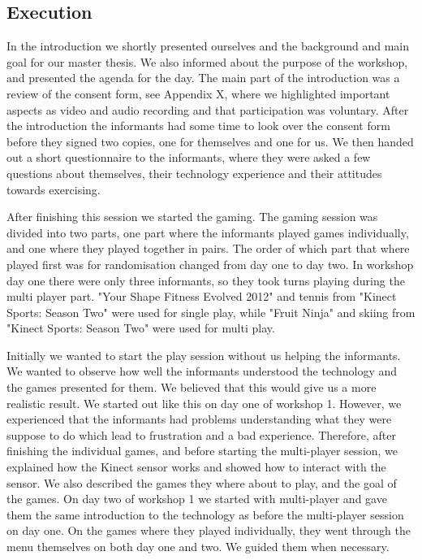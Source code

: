 \subsection{Execution}
In the introduction we shortly presented ourselves and the background and main goal for our master thesis. We also informed about the purpose of the workshop, and presented the agenda for the day. The main part of the introduction was a review of the consent form, see Appendix X, where we highlighted important aspects as video and audio recording and that participation was voluntary. After the introduction the informants had some time to look over the consent form before they signed two copies, one for themselves and one for us. We then handed out a short questionnaire to the informants, where they were asked a few questions about themselves, their technology experience and their attitudes towards exercising. 

After finishing this session we started the gaming. The gaming session was divided into two parts, one part where the informants played games individually, and one where they played together in pairs. The order of which part that where played first was for randomisation changed from day one to day two. In workshop day one there were only three informants, so they took turns playing during the multi player part. "Your Shape Fitness Evolved 2012" and tennis from "Kinect Sports: Season Two" were used for single play, while "Fruit Ninja" and skiing from "Kinect Sports: Season Two" were used for multi play. 

Initially we wanted to start the play session without us helping the informants. We wanted to observe how well the informants understood the technology and the games presented for them. We believed that this would give us a more realistic result. We started out like this on day one of workshop 1. However, we experienced that the informants had problems understanding what they were suppose to do which lead to frustration and a bad experience. Therefore, after finishing the individual games, and before starting the multi-player session, we explained how the Kinect sensor works and showed how to interact with the sensor. We also described the games they where about to play, and the goal of the games. On day two of workshop 1 we started with multi-player and gave them the same introduction to the technology as before the multi-player session on day one. On the games where they played individually, they went through the menu themselves on both day one and two. We guided them when necessary. 

